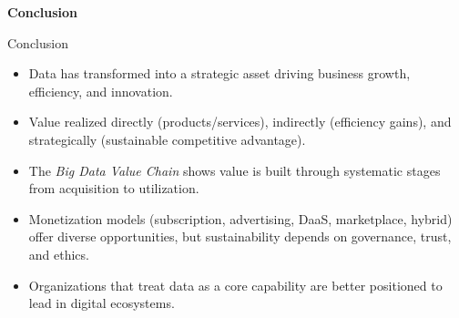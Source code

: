 \documentclass[aspectratio=169, table]{beamer}
\begin{document}
\begin{frame}{\hfill}
	\centering
	\Huge{\textbf{Conclusion}}
\end{frame}

\begin{frame}{Conclusion}
	\vspace{12pt}
	\begin{itemize}
		\item Data has transformed into a strategic asset driving business growth, efficiency, and innovation.  
		\item Value realized directly (products/services), indirectly (efficiency gains), and strategically (sustainable competitive advantage).  
		\item The \textit{Big Data Value Chain} shows value is built through systematic stages from acquisition to utilization.  
		\item Monetization models (subscription, advertising, DaaS, marketplace, hybrid) offer diverse opportunities, but sustainability depends on governance, trust, and ethics.  
		\item Organizations that treat data as a core capability are better positioned to lead in digital ecosystems.  
	\end{itemize}
\end{frame}
\end{document}
